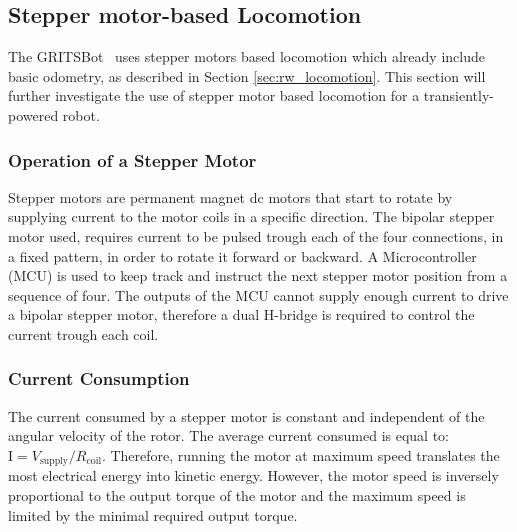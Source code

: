 \subsection{Stepper motor-based Locomotion}

The GRITSBot~\cite{pickem_icra_2015} uses stepper motors based locomotion which already include basic odometry, as described in Section \ref{sec:rw_locomotion}.
This section will further investigate the use of stepper motor based locomotion for a transiently-powered robot.

\subsubsection{Operation of a Stepper Motor}
Stepper motors are permanent magnet dc motors that start to rotate by supplying current to the motor coils in a specific direction.
The bipolar stepper motor used, requires current to be pulsed trough each of the four connections, in a fixed pattern, in order to rotate it forward or backward.
A Microcontroller (MCU) is used to keep track and instruct the next stepper motor position from a sequence of four.
The outputs of the MCU cannot supply enough current to drive a bipolar stepper motor, therefore a dual H-bridge is required to control the current trough each coil.


\subsubsection{Current Consumption}
The current consumed by a stepper motor is constant and independent of the angular velocity of the rotor.
The average current consumed is equal to: $\textrm{I} = V_{\text{supply}}/R_{\text{coil}}$.
Therefore, running the motor at maximum speed translates the most electrical energy into kinetic energy.
However, the motor speed is inversely proportional to the output torque of the motor and the maximum speed is limited by the minimal required output torque.

